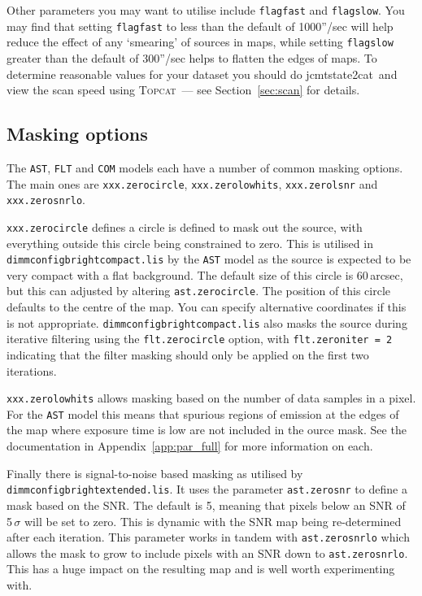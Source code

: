 \documentclass[twoside,11pt]{article}
\newcommand{\htmladdnormallink}[2]{#1}
\newcommand{\htmlref}[2]{#1}
\newcommand{\latexhtml}[2]{#1}
\newcommand{\xref}[3]{#1}
\newcommand{\xlabel}[1]{}
\renewcommand{\_}{\texttt{\symbol{95}}}
\newcommand{\topcat}{\htmladdnormallink{\textsc{Topcat}}{http://www.starlink.ac.uk/topcat}}
\newcommand{\task}[1]{\textsf{#1}}
\newcommand{\jcmtstate}{\xref{\task{jcmtstate2cat}}{sun258}{JCMTSTATE2CAT}}
\newcommand{\cref}[3]{\latexhtml{#1~\ref{#2}}{\htmlref{#3}{#2}}}
\begin{document}
Other parameters you may want to utilise include \texttt{flagfast} and
\texttt{flagslow}. You may find that setting \texttt{flagfast} to less
than the default of 1000''/sec will help reduce the effect of any
`smearing' of sources in maps, while setting \texttt{flagslow} greater
than the default of 300''/sec helps to flatten the edges of maps. To
determine reasonable values for your dataset you should do \jcmtstate\
and view the scan speed using \topcat\ --- see
\cref{Section}{sec:scan}{Displaying scan patterns} for details.

\subsection{\xlabel{mask}Masking options}
\label{sec:mask}

The \texttt{AST}, \texttt{FLT} and \texttt{COM} models each have a
number of common masking options. The main ones are
\texttt{xxx.zero\_circle}, \texttt{xxx.zero\_lowhits},
\texttt{xxx.zero\_lsnr} and \texttt{xxx.zero\_snrlo}.

\texttt{xxx.zero\_circle} defines a circle is defined to mask out the
source, with everything outside this circle being constrained to zero.
This is utilised in \texttt{dimmconfig\_bright\_compact.lis} by the
\texttt{AST} model as the source is expected to be very compact with a
flat background. The default size of this circle is 60\,arcsec, but
this can adjusted by altering \texttt{ast.zero\_circle}. The position
of this circle defaults to the centre of the map. You can specify
alternative coordinates if this is not appropriate.
\texttt{dimmconfig\_bright\_compact.lis} also masks the source during
iterative filtering using the \texttt{flt.zero\_circle} option, with
\texttt{flt.zero\_niter = 2} indicating that the filter masking should
only be applied on the first two iterations.

\texttt{xxx.zero\_lowhits} allows masking based on the number of data
samples in a pixel. For the \texttt{AST} model this means that
spurious regions of emission at the edges of the map where exposure
time is low are not included in the ource mask. See the documentation
in \cref{Appendix}{app:par_full}{this appendix} for more information
on each.

Finally there is signal-to-noise based masking as utilised by
\texttt{dimmconfig\_bright\_extended.lis}. It uses the parameter
\texttt{ast.zero\_snr} to define a mask based on the SNR. The default
is 5, meaning that pixels below an SNR of 5\,$\sigma$ will be set to
zero. This is dynamic with the SNR map being re-determined after each
iteration. This parameter works in tandem with
\texttt{ast.zero\_snrlo} which allows the mask to grow to include
pixels with an SNR down to \texttt{ast.zero\_snrlo}. This has a huge
impact on the resulting map and is well worth experimenting with.
\end{document}
